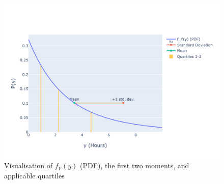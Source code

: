 \begin{figure}[h]
\centering
\includegraphics[width=17cm]{pics/1c2.pdf}
\caption{Visualisation of $f_Y(y)$ (PDF), the first two moments, and applicable quartiles}
\label{fig:1c2}
\end{figure}
\FloatBarrier

